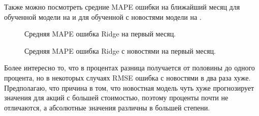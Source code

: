\documentclass[12pt, a4paper]{article}
\begin{document}
Также можно посмотреть средние MAPE ошибки на ближайший месяц для обученной модели на  и для обученной с новостями модели на .
\begin{figure}[!h]
\caption{Средняя MAPE ошибка Ridge на первый месяц.}
\label{fig:ridge}
\end{figure}
\begin{figure}[!h]
\caption{Средняя MAPE ошибка Ridge с новостями на первый месяц.}
\label{fig:ridge_with_news}
\end{figure}

Более интересно то, что в процентах разница получается от половины до одного процента, но в некоторых случаях RMSE ошибка с новостями в два раза хуже. Предполагаю, что причина в том, что новостная модель чуть хуже прогнозирует значения для акций с большей стоимостью, поэтому проценты почти не отличаются, а абсолютные значения различны в большей степени.
\end{document}
